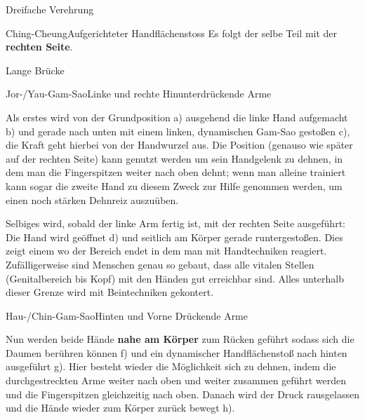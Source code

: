 \begin{WTSatz}{Dreifache Verehrung}
\begin{WTSatzTeil}{Ching-Cheung}{Aufgerichteter Handfl\"achenstoss}
		Es folgt der selbe Teil mit der \textbf{rechten Seite}.
		
		
	\end{WTSatzTeil}
	
\end{WTSatz}




\begin{WTSatz}{Lange Br\"ucke}%

	
	\begin{WTSatzTeil}{Jor-/Yau-Gam-Sao}{Linke und rechte Hinunterdr\"uckende Arme}
		
		Als erstes wird von der Grundposition a) ausgehend die linke Hand aufgemacht b) und gerade nach unten mit einem linken, dynamischen Gam-Sao gesto{\ss}en c), die Kraft geht hierbei von der Handwurzel aus. Die Position (genauso wie sp\"ater auf der rechten Seite) kann genutzt werden um sein Handgelenk zu dehnen, in dem man die Fingerspitzen weiter nach oben dehnt; wenn man alleine trainiert kann sogar die zweite Hand zu diesem Zweck zur Hilfe genommen werden, um einen noch st\"arken Dehnreiz auszu\"uben.
		
		
		Selbiges wird, sobald der linke Arm fertig ist, mit der rechten Seite ausgef\"uhrt: Die Hand wird ge\"offnet d) und seitlich am K\"orper gerade runtergesto{\ss}en. Dies zeigt einem wo der Bereich endet in dem man mit Handtechniken reagiert. Zuf\"alligerweise sind Menschen genau so gebaut, dass alle vitalen Stellen (Genitalbereich bis Kopf) mit den H\"anden gut erreichbar sind. Alles unterhalb dieser Grenze wird mit Beintechniken gekontert.
		
	\end{WTSatzTeil}
	\begin{WTSatzTeil}{Hau-/Chin-Gam-Sao}{Hinten und Vorne Dr\"uckende Arme}
		
		Nun werden beide H\"ande \textbf{nahe am K\"orper} zum R\"ucken gef\"uhrt sodass sich die Daumen ber\"uhren k\"onnen f) und ein dynamischer Handfl\"achensto{\ss} nach hinten ausgef\"uhrt g). Hier besteht wieder die M\"oglichkeit sich zu dehnen, indem die durchgestreckten Arme weiter nach oben und weiter zusammen gef\"uhrt werden und die Fingerspitzen gleichzeitig nach oben. Danach wird der Druck rausgelassen und die H\"ande wieder zum K\"orper zur\"uck bewegt h).
		

\end{WTSatzTeil}
\end{WTSatz}
